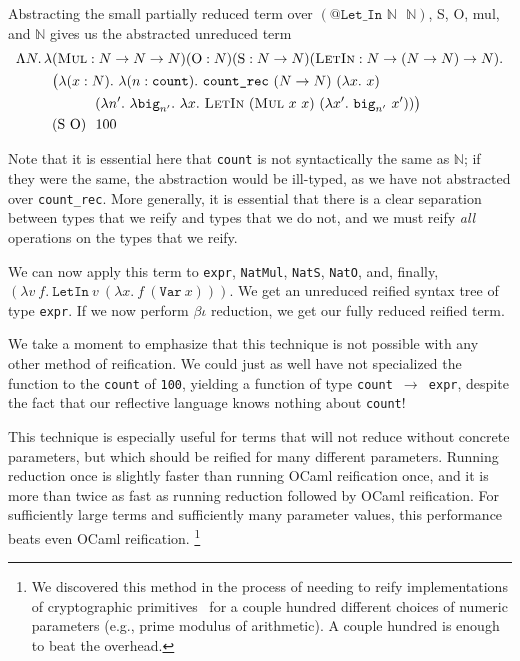 Abstracting the small partially reduced term over $(\texttt{@Let\_In $\mathbb N$ $\mathbb N$})$, S, O, mul, and $\mathbb N$ gives us the abstracted unreduced term
\begin{align*}
\Lambda N.\,\lambda & (\textsc{Mul} : N \to N \to N)%
 (\text{O} : N)%
 (\text{S} : N \to N)%
 (\textsc{LetIn} : N \to (N\to N)\to N). \\
& \big(\lambda (x : N).\ \lambda(n : \texttt{count}).\ %
\texttt{count\_rec}\ %
(N \to N)\ %
(\lambda x.\ x) \\
&\phantom{\big(\texttt{count}}(\lambda n'.\ \lambda\texttt{big}_{n'}.
  \ \lambda x.
  \ \textsc{LetIn}\ (\textsc{Mul}\ x\ x)\ (\lambda x'.\ \texttt{big}_{n'}\ x'))\big)\\
& (\text{S O})\ \  %
 100
\end{align*}

Note that it is essential here that \texttt{count} is not syntactically the same as $\mathbb N$; if they were the same, the abstraction would be ill-typed, as we have not abstracted over \texttt{count\_rec}.
More generally, it is essential that there is a clear separation between types that we reify and types that we do not, and we must reify \emph{all} operations on the types that we reify.

We can now apply this term to \texttt{expr}, \texttt{NatMul}, \texttt{NatS}, \texttt{NatO}, and, finally, $(\lambda v\ f.\ \texttt{LetIn}\ v\ (\lambda x.\ f\ (\texttt{Var}\ x)))$.
We get an unreduced reified syntax tree of type \texttt{expr}.
If we now perform $\beta\iota$ reduction, we get our fully reduced reified term.

We take a moment to emphasize that this technique is not possible with any other method of reification.
We could just as well have not specialized the function to the \texttt{count} of \texttt{100}, yielding a function of type \texttt{count $\to$ expr}, despite the fact that our reflective language knows nothing about \texttt{count}!

This technique is especially useful for terms that will not reduce without concrete parameters, but which should be reified for many different parameters.
Running reduction once is slightly faster than running OCaml reification once, and it is more than twice as fast as running reduction followed by OCaml reification.
For sufficiently large terms and sufficiently many parameter values, this performance beats even OCaml reification.%
\footnote{%
    We discovered this method in the process of needing to reify implementations of cryptographic primitives~\cite{FiatCryptoSP19} for a couple hundred different choices of numeric parameters (e.g., prime modulus of arithmetic).
    A couple hundred is enough to beat the overhead.%
}

